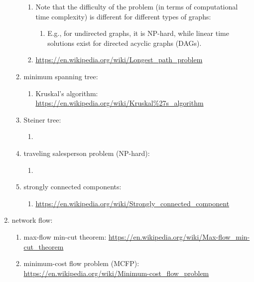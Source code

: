 \begin{enumerate}
\begin{enumerate}
		\begin{enumerate} \itemsep -2pt
		\item Note that the difficulty of the problem (in terms of computational time complexity) is different for different types of graphs: \vspace{-0.1cm}
			\begin{enumerate} \itemsep -1pt
			\item E.g., for undirected graphs, it is NP-hard, while linear time solutions exist for directed acyclic graphs (DAGs).
			\end{enumerate}
		\item \url{https://en.wikipedia.org/wiki/Longest_path_problem}
		\end{enumerate}
	\item minimum spanning tree: \vspace{-0.2cm}
		\begin{enumerate} \itemsep -2pt
		\item Kruskal's algorithm: \url{https://en.wikipedia.org/wiki/Kruskal%27s_algorithm}
		\end{enumerate}
	\item Steiner tree: \vspace{-0.2cm}
		\begin{enumerate} \itemsep -2pt
		\item 
		\end{enumerate}
	\item traveling salesperson problem (NP-hard): \vspace{-0.2cm}
		\begin{enumerate} \itemsep -2pt
		\item 
		\end{enumerate}
	\item strongly connected components: \vspace{-0.2cm}
		\begin{enumerate} \itemsep -2pt
		\item \url{https://en.wikipedia.org/wiki/Strongly_connected_component}
		\end{enumerate}
	\end{enumerate}
\item network flow: \vspace{-0.3cm}
	\begin{enumerate} \itemsep -2pt
	\item max-flow min-cut theorem: \url{https://en.wikipedia.org/wiki/Max-flow_min-cut_theorem}
	\item minimum-cost flow problem (MCFP): \url{https://en.wikipedia.org/wiki/Minimum-cost_flow_problem}

\end{enumerate}
\end{enumerate}
